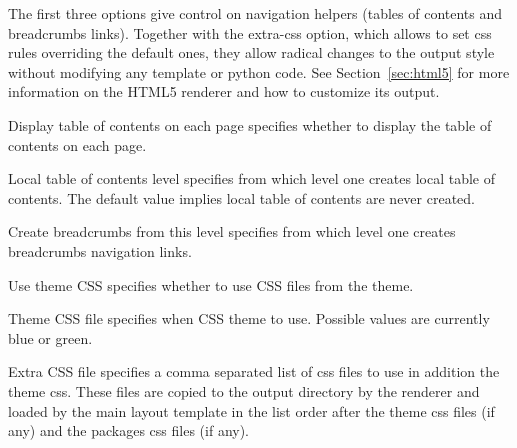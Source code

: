 The first three options give control on navigation helpers (tables of
contents and breadcrumbs links). Together with the extra-css option,
which allows to set css rules overriding the default ones, they allow
radical changes to the output style without modifying any template or
python code. See Section~\ref{sec:html5} for more information on the
HTML5 renderer and how to customize its output.

\begin{configuration}{Display table of contents on each page}
specifies whether to display the table of contents on each page.
\end{configuration}


\begin{configuration}{Local table of contents level}
specifies from which level one creates local table of contents. The
default value implies local table of contents are never created.
\end{configuration}


\begin{configuration}{Create breadcrumbs from this level}
specifies from which level one creates breadcrumbs navigation links.
\end{configuration}

\begin{configuration}{Use theme CSS}
specifies whether to use CSS files from the theme.
\end{configuration}

\begin{configuration}{Theme CSS file}
specifies when CSS theme to use. Possible values are currently blue or
green.
\end{configuration}

\begin{configuration}{Extra CSS file}
specifies a comma separated list of css files to use in addition the
theme css. These files are copied to the output directory by the
renderer and loaded by the main layout template in the list order after
the theme css files (if any) and the packages css files (if any).
\end{configuration}

